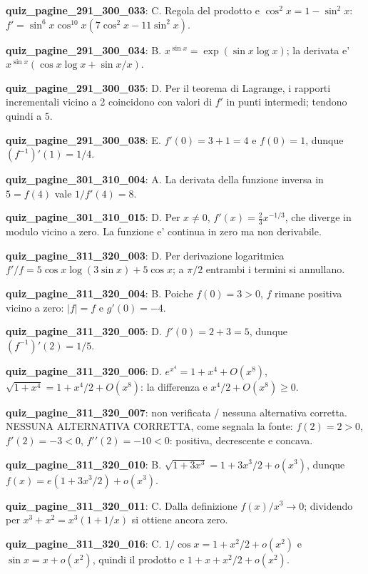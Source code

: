 \documentclass[11pt,a4paper]{article}
\newcounter{quiz}
\begin{document}
\noindent\textbf{quiz\_pagine\_291\_300\_033}: C. Regola del prodotto e $\cos^2x=1-\sin^2x$: $f'=\sin^6x\cos^{10}x(7\cos^2x-11\sin^2x)$.\par\medskip
\noindent\textbf{quiz\_pagine\_291\_300\_034}: B. $x^{\sin x}=\exp(\sin x\log x)$; la derivata e' $x^{\sin x}(\cos x\log x+\sin x/x)$.\par\medskip
\noindent\textbf{quiz\_pagine\_291\_300\_035}: D. Per il teorema di Lagrange, i rapporti incrementali vicino a 2 coincidono con valori di $f'$ in punti intermedi; tendono quindi a $5$.\par\medskip
\noindent\textbf{quiz\_pagine\_291\_300\_038}: E. $f'(0)=3+1=4$ e $f(0)=1$, dunque $(f^{-1})'(1)=1/4$.\par\medskip
\noindent\textbf{quiz\_pagine\_301\_310\_004}: A. La derivata della funzione inversa in $5=f(4)$ vale $1/f\prime(4)=8$.\par\medskip
\noindent\textbf{quiz\_pagine\_301\_310\_015}: D. Per $x\ne0$, $f\prime(x)=\frac23 x^{-1/3}$, che diverge in modulo vicino a zero. La funzione e' continua in zero ma non derivabile.\par\medskip
\noindent\textbf{quiz\_pagine\_311\_320\_003}: D. Per derivazione logaritmica $f\prime/f=5\cos x\log(3\sin x)+5\cos x$; a $\pi/2$ entrambi i termini si annullano.\par\medskip
\noindent\textbf{quiz\_pagine\_311\_320\_004}: B. Poiche $f(0)=3>0$, $f$ rimane positiva vicino a zero: $|f|=f$ e $g\prime(0)=-4$.\par\medskip
\noindent\textbf{quiz\_pagine\_311\_320\_005}: D. $f\prime(0)=2+3=5$, dunque $(f^{-1})\prime(2)=1/5$.\par\medskip
\noindent\textbf{quiz\_pagine\_311\_320\_006}: D. $e^{x^4}=1+x^4+O(x^8)$, $\sqrt{1+x^4}=1+x^4/2+O(x^8)$: la differenza e $x^4/2+O(x^8)\geq0$.\par\medskip
\noindent\textbf{quiz\_pagine\_311\_320\_007}: non verificata / nessuna alternativa corretta. NESSUNA ALTERNATIVA CORRETTA, come segnala la fonte: $f(2)=2>0$, $f\prime(2)=-3<0$, $f\prime\prime(2)=-10<0$: positiva, decrescente e concava.\par\medskip
\noindent\textbf{quiz\_pagine\_311\_320\_010}: B. $\sqrt{1+3x^3}=1+3x^3/2+o(x^3)$, dunque $f(x)=e(1+3x^3/2)+o(x^3)$.\par\medskip
\noindent\textbf{quiz\_pagine\_311\_320\_011}: C. Dalla definizione $f(x)/x^3\to0$; dividendo per $x^3+x^2=x^3(1+1/x)$ si ottiene ancora zero.\par\medskip
\noindent\textbf{quiz\_pagine\_311\_320\_016}: C. $1/\cos x=1+x^2/2+o(x^2)$ e $\sin x=x+o(x^2)$, quindi il prodotto e $1+x+x^2/2+o(x^2)$.\par\medskip
\end{document}
